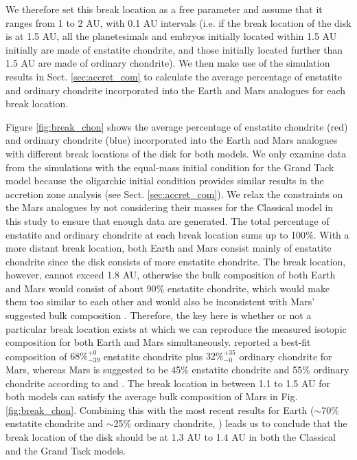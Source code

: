 \documentclass{aa}
\begin{document}
We therefore set this break location as a free parameter and assume that it ranges from 1 to 2 AU, with 0.1 AU intervals (i.e. if the break location of the disk is at 1.5 AU, all the planetesimals and embryos initially located within 1.5 AU initially are made of enstatite chondrite, and those initially located further than 1.5 AU are made of ordinary chondrite). We then make use of the simulation results in Sect. \ref{sec:accret_com} to calculate the average percentage of enstatite and ordinary chondrite incorporated into the Earth and Mars analogues for each break location.

Figure \ref{fig:break_chon} shows the average percentage of enstatite chondrite (red) and ordinary chondrite (blue) incorporated into the Earth and Mars analogues with different break locations of the disk for both models. We only examine data from the simulations with the equal-mass initial condition for the Grand Tack model because the oligarchic initial condition provides similar results in the accretion zone analysis (see Sect. \ref{sec:accret_com}). We relax the constraints on the Mars analogues by not considering their masses for the Classical model in this study to ensure that enough data are generated. The total percentage of enstatite and ordinary chondrite at each break location sums up to 100$\%$. With a more distant break location, both Earth and Mars consist mainly of enstatite chondrite since the disk consists of more enstatite chondrite. The break location, however, cannot exceed 1.8 AU, otherwise the bulk composition of both Earth and Mars would consist of about 90$\%$ enstatite chondrite, which would make them too similar to each other and would also be inconsistent with Mars’ suggested bulk composition \citep{sanloup1999simple}. Therefore, the key here is whether or not a particular break location exists at which we can reproduce the measured isotopic composition for both Earth and Mars simultaneously. \cite{brasser2018GRL} reported a best-fit composition of $68\%^{+0}_{-39}$ enstatite chondrite plus $32\%^{+35}_{-0}$  ordinary chondrite for Mars, whereas Mars is suggested to be 45\% enstatite chondrite and 55\% ordinary chondrite according to \cite{sanloup1999simple} and \cite{tang201460fe}. The break location in between 1.1 to 1.5 AU for both models can satisfy the average bulk composition of Mars in Fig. \ref{fig:break_chon}. Combining this with the most recent results for Earth ($\sim$70\% enstatite chondrite and $\sim$25\% ordinary chondrite, \cite{dauphas2017isotopic}) leads us to conclude that the break location of the disk should be at 1.3 AU to 1.4 AU in both the Classical and the Grand Tack models. 
\end{document}
